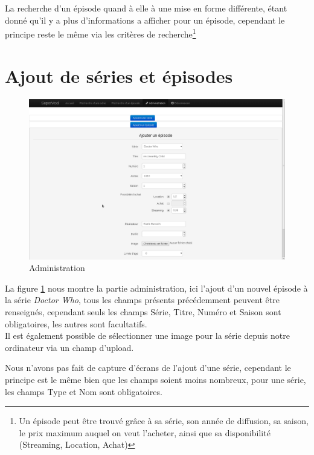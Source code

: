 \documentclass[12pt,a4paper,openany]{book}
\begin{document}
	La recherche d'un épisode quand à elle à une mise en forme différente, étant donné qu'il y a plus d'informations a afficher pour un épisode, cependant le
	principe reste le même via les critères de recherche\footnote{Un épisode peut être trouvé grâce à sa série, son année de diffusion, sa saison, le prix
	maximum auquel on veut l'acheter, ainsi que sa disponibilité (Streaming, Location, Achat)}
	\section{Ajout de séries et épisodes}
	\begin{figure}[H]
		\centering
		\includegraphics[width=18.5cm]{screens/adminEpisode.png}
		\caption{Administration}
		\label{fig:admin}
	\end{figure}
	La figure \ref{fig:admin} nous montre la partie administration, ici l'ajout d'un nouvel épisode à la série \textit{Doctor Who}, tous les champs présents
	précédemment peuvent être renseignés, cependant seuls les champs Série, Titre, Numéro et Saison sont obligatoires, les autres sont facultatifs.\\
	Il est également possible de sélectionner une image pour la série depuis notre ordinateur via un champ d'upload.

	Nous n'avons pas fait de capture d'écrans de l'ajout d'une série, cependant le principe est le même bien que les champs soient moins nombreux, pour une
	série, les champs Type et Nom sont obligatoires.
\end{document}
